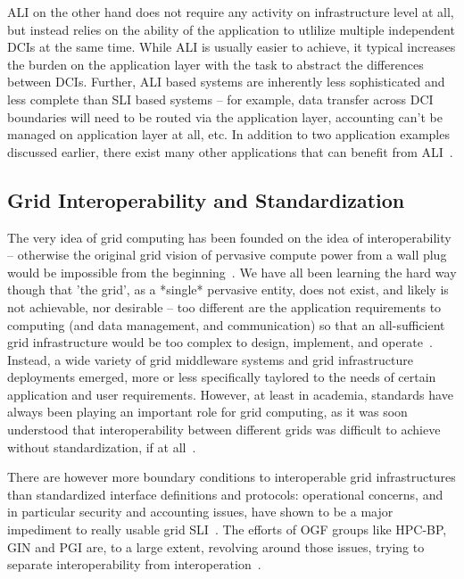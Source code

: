 \documentclass[10pt,conference,final,letterpaper,twoside,twocolumn,]{IEEEtran}
\begin{document}
 ALI on the other hand does not require any activity on infrastructure
 level at all, but instead relies on the ability of the application to
 utlilize multiple independent DCIs at the same time.  While ALI is
 usually easier to achieve, it typical increases the burden on the
 application layer with the task to abstract the differences between
 DCIs.  Further, ALI based systems are inherently less sophisticated
 and less complete than SLI based systems -- for example, data
 transfer across DCI boundaries will need to be routed via the
 application layer, accounting can't be managed on application layer
 at all, etc. In addition to two application examples discussed
 earlier, there exist many other applications that can benefit from
 ALI~\cite{fgcs-interop}.
 
 

 \subsection*{Grid Interoperability and Standardization}

 The very idea of grid computing has been founded on the idea of
 interoperability -- otherwise the original grid vision of pervasive
 compute power from a wall plug would be impossible from the
 beginning~\cite{blueprint}.  We have all been learning the hard way
 though that 'the grid', as a *single* pervasive entity, does not
 exist, and likely is not achievable, nor desirable -- too different
 are the application requirements to computing (and data management,
 and communication) so that an all-sufficient grid infrastructure
 would be too complex to design, implement, and operate~\cite{ogsa-use-cases}.
 Instead, a wide variety of grid middleware systems and grid
 infrastructure deployments emerged, more or less specifically
 taylored to the needs of certain application and user requirements.
 However, at least in academia, standards have always been playing an
 important role for grid computing, as it was soon understood that
 interoperability between different grids was difficult to achieve
 without standardization, if at all~\cite{...}.

 There are however more boundary conditions to interoperable grid
 infrastructures than standardized interface definitions and
 protocols: operational concerns, and in particular security and
 accounting issues, have shown to be a major impediment to really
 usable grid SLI~\cite{gin-usecases}.  The efforts of OGF groups like
 HPC-BP, GIN and PGI are, to a large extent, revolving around those
 issues, trying to separate interoperability from
 interoperation~\cite{gin-papers, ogf-www}.
\end{document}
